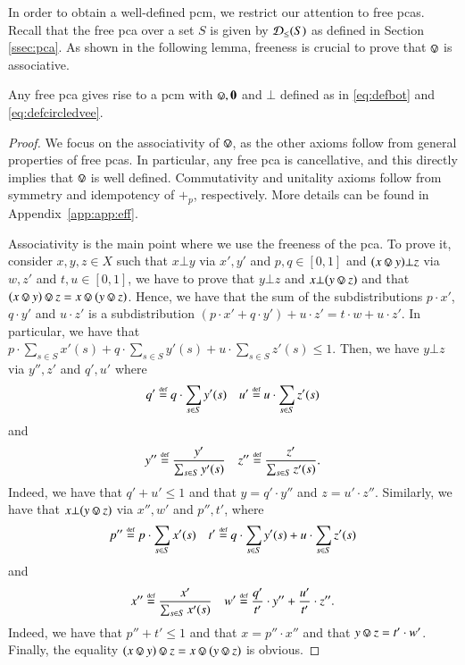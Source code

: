 In order to obtain a well-defined pcm, we restrict our attention to free pcas. Recall that the free pca over a set $S$ is given by $\mathcal{D}_{\leq}(S)$ as defined in Section \ref{ssec:pca}. %
As shown in the following lemma, freeness is crucial to prove that $\circledvee$ is associative.
\begin{lemma}\label{lemma:pca-pcm}
Any free pca gives rise to a pcm with $\circledvee, \zeropcm$ and $\bot$ defined as in \eqref{eq:defbot} and \eqref{eq:defcircledvee}.
\end{lemma}%
\begin{proof}
    


We focus on the associativity of $\circledvee$, as the other axioms follow from general properties of free pcas. In particular, any free pca is cancellative, and this directly implies that $\circledvee$ is well defined. Commutativity and unitality axioms follow from symmetry and idempotency of $+_p$, respectively. More details can be found in Appendix~\ref{app:app:eff}.

Associativity is the main point where we use the freeness of the pca. To prove it, consider $x,y,z\in X$ such that $x\bot y$ via $x',y'$ and $p,q\in [0,1]$ and $(x\circledvee y) \bot z$ via $w,z'$ and $t,u\in [0,1]$, we have to prove that $ y\bot z$ and $x \bot (y\circledvee z)$ and that $(x\circledvee y) \circledvee z = x\circledvee (y \circledvee z)$. Hence, we have that the sum of the subdistributions $p\cdot x'$, $q\cdot y'$ and $u\cdot z'$ is a subdistribution $(p\cdot x' + q\cdot y' ) + u\cdot z'= t\cdot w + u\cdot z'$. In particular, we have that $p\cdot\sum_{s\in S} x'(s) + q\cdot \sum_{s\in S} y'(s) + u\cdot \sum_{s\in S} z'(s) \leq 1$. Then, we have $y\bot z$ via $y'',z'$ and $q',u'$ where 
\[ q'\stackrel{\text{\tiny def}}{=} q\cdot \sum_{s\in S} y'(s) \quad u' \stackrel{\text{\tiny def}}{=} u\cdot \sum_{s\in S} z'(s)\]
and
\[y''\stackrel{\text{\tiny def}}{=} \frac{y'}{\sum_{s\in S} y'(s)} \quad z''\stackrel{\text{\tiny def}}{=} \frac{z'}{\sum_{s\in S} z'(s)}\text.\]
Indeed, we have that $q'+u' \leq 1$ and that $y=q'\cdot y''$ and $z=u'\cdot z''$. Similarly, we have that $x \bot (y\circledvee z)$ via $x'',w'$ and $p'',t'$, where
\[ p''\stackrel{\text{\tiny def}}{=} p\cdot \sum_{s\in S} x'(s) \quad t' \stackrel{\text{\tiny def}}{=} q\cdot \sum_{s\in S} y'(s) + u\cdot \sum_{s\in S} z'(s)\]
and
\[x''\stackrel{\text{\tiny def}}{=} \frac{x'}{\sum_{s\in S} x'(s)} \quad w'\stackrel{\text{\tiny def}}{=} \frac{q'}{t'}\cdot y'' + {\frac{u'}{t'}}\cdot z''\text.\]
Indeed, we have that $p''+t' \leq 1$ and that $x=p''\cdot x''$ and that $y\circledvee z = t' \cdot w'$. Finally, the equality $(x\circledvee y) \circledvee z = x\circledvee (y \circledvee z)$ is obvious.
\end{proof}



